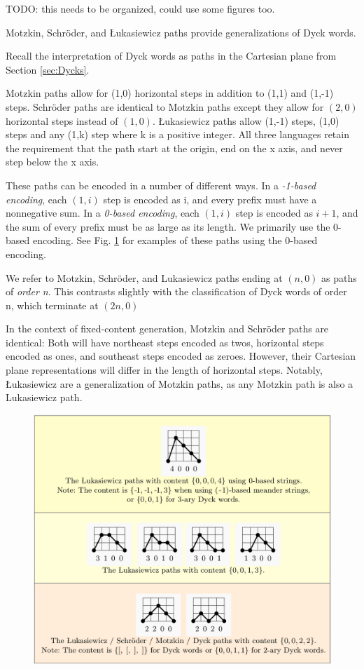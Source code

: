 TODO: this needs to be organized, could use some figures too.

Motzkin, Schröder, and Łukasiewicz paths provide generalizations of Dyck words.  

Recall the interpretation of Dyck words as paths in the Cartesian plane from Section \ref{sec:Dycks}.

Motzkin paths allow for (1,0) horizontal steps in addition to (1,1) and (1,-1) steps. Schröder paths are identical to Motzkin paths except they allow for $(2,0)$ horizontal steps instead of $(1,0)$.  Łukasiewicz paths allow (1,-1) steps, (1,0) steps and any (1,k) step where k is a positive integer.  All three languages retain the requirement that the path start at the origin, end on the x axis, and never step below the x axis. 

These paths can be encoded in a number of different ways.  In a \emph{-1-based encoding}, each $(1,i)$ step is encoded as i, and every prefix must have a nonnegative sum.  In a \emph{0-based encoding}, each $(1,i)$ step is encoded as $i+1$, and the sum of every prefix must be as large as its length. We primarily use the 0-based encoding. See Fig. \ref{fig:paths}  for examples of these paths using the 0-based encoding.

We refer to Motzkin, Schröder, and Lukasiewicz paths ending at $(n,0)$ as paths of \emph{order n}.  This contrasts slightly with the classification of Dyck words of order n, which terminate at $(2n,0)$

In the context of fixed-content generation, Motzkin and Schröder paths are identical:  Both will have northeast steps encoded as twos, horizontal steps encoded as ones, and southeast steps encoded as zeroes.  However, their Cartesian plane representations will differ in the length of horizontal steps. Notably, Łukasiewicz are a generalization of Motzkin paths, as any Motzkin path is also a Lukasiewicz path.

\begin{figure}[]
	\centering
	\includegraphics[width = .95 \textwidth]{paths.png}
	\caption{}
	\label{fig:paths}
\end{figure}


